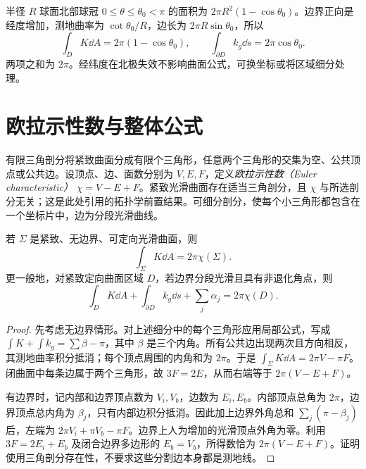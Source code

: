 \begin{example}[球冠的边界曲率核对]
半径 $R$ 球面北部球冠 $0\le\theta\le\theta_0<\pi$ 的面积为 $2\pi R^2(1-\cos\theta_0)$。边界正向是经度增加，测地曲率为 $\cot\theta_0/R$，边长为 $2\pi R\sin\theta_0$，所以
\[
 \int_DK\dd A=2\pi(1-\cos\theta_0),\qquad
 \int_{\partial D}k_g\dd s=2\pi\cos\theta_0.
\]
两项之和为 $2\pi$。经纬度在北极失效不影响曲面公式，可换坐标或将区域细分处理。
\end{example}

\section{欧拉示性数与整体公式}
有限三角剖分将紧致曲面分成有限个三角形，任意两个三角形的交集为空、公共顶点或公共边。设顶点、边、面数分别为 $V,E,F$，定义\emph{欧拉示性数（Euler characteristic）} $\chi=V-E+F$。紧致光滑曲面存在适当三角剖分，且 $\chi$ 与所选剖分无关；这是此处引用的拓扑学前置结果。可细分剖分，使每个小三角形都包含在一个坐标片中，边为分段光滑曲线。

\begin{theorem}
若 $\Sigma$ 是紧致、无边界、可定向光滑曲面，则
\begin{equation}
 \int_\Sigma K\dd A=2\pi\chi(\Sigma).
 \label{eq:dg-global-gb}
\end{equation}
更一般地，对紧致定向曲面区域 $D$，若边界分段光滑且具有非退化角点，则
\begin{equation}
 \int_DK\dd A+\int_{\partial D}k_g\dd s+\sum_j\alpha_j
 =2\pi\chi(D).
 \label{eq:dg-boundary-gb}
\end{equation}
\label{thm:dg-global-gb}
\end{theorem}
\begin{proof}
先考虑无边界情形。对上述细分中的每个三角形应用局部公式，写成 $\int K+\int k_g=\sum\beta-\pi$，其中 $\beta$ 是三个内角。所有公共边出现两次且方向相反，其测地曲率积分抵消；每个顶点周围的内角和为 $2\pi$。于是 $\int_\Sigma K\dd A=2\pi V-\pi F$。闭曲面中每条边属于两个三角形，故 $3F=2E$，从而右端等于 $2\pi(V-E+F)$。

有边界时，记内部和边界顶点数为 $V_i,V_b$，边数为 $E_i,E_b$。内部顶点总角为 $2\pi$，边界顶点总内角为 $\beta_j$，只有内部边积分抵消。因此加上边界外角总和 $\sum_j(\pi-\beta_j)$ 后，左端为 $2\pi V_i+\pi V_b-\pi F$。边界上人为增加的光滑顶点外角为零。利用 $3F=2E_i+E_b$ 及闭合边界多边形的 $E_b=V_b$，所得数恰为 $2\pi(V-E+F)$。证明使用三角剖分存在性，不要求这些分割边本身都是测地线。
\end{proof}


